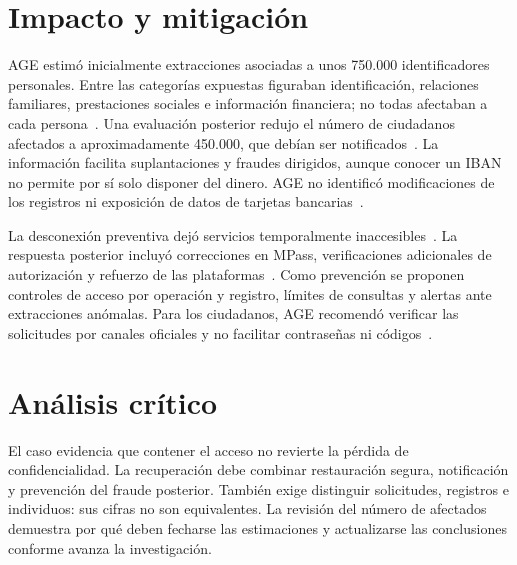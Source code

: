 \section{Impacto y mitigación}
AGE estimó inicialmente extracciones asociadas a unos
750.000 identificadores personales. Entre las categorías
expuestas figuraban identificación, relaciones familiares,
prestaciones sociales e información financiera; no todas
afectaban a cada persona~\cite{age2026datos}.
Una evaluación posterior redujo el número de ciudadanos
afectados a aproximadamente 450.000, que debían ser
notificados~\cite{presidencia2026moldavia}.
La información facilita suplantaciones y fraudes dirigidos,
aunque conocer un IBAN no permite por sí solo disponer
del dinero. AGE no identificó modificaciones de los
registros ni exposición de datos de tarjetas
bancarias~\cite{age2026datos}.

La desconexión preventiva dejó servicios temporalmente
inaccesibles~\cite{age2026inicial}.
La respuesta posterior incluyó correcciones en MPass,
verificaciones adicionales de autorización y refuerzo
de las plataformas~\cite{presidencia2026moldavia}.
Como prevención se proponen controles de acceso por
operación y registro, límites de consultas y alertas
ante extracciones anómalas. Para los ciudadanos, AGE
recomendó verificar las solicitudes por canales oficiales
y no facilitar contraseñas ni códigos~\cite{age2026datos}.

\section{Análisis crítico}
El caso evidencia que contener el acceso no revierte
la pérdida de confidencialidad. La recuperación debe
combinar restauración segura, notificación y prevención
del fraude posterior.
También exige distinguir solicitudes, registros e individuos:
sus cifras no son equivalentes. La revisión del número
de afectados demuestra por qué deben fecharse las
estimaciones y actualizarse las conclusiones conforme
avanza la investigación.